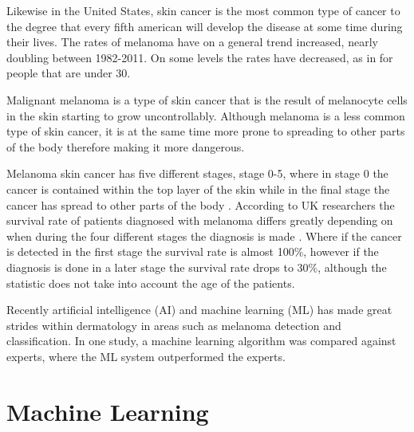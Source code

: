 \documentclass{kththesis}
\begin{document}
Likewise in the United States, skin cancer is the most common type of cancer to the degree that every fifth american will develop the disease at some time during their lives. The rates of melanoma have on a general trend increased, nearly doubling between 1982-2011. On some levels the rates have decreased, as in for people that are under 30. \parencite{aad-skin-cancer}

Malignant melanoma is a type of skin cancer that is the result of melano\-cyte cells in the skin starting to grow uncontrollably.
Although melanoma is a less common type of skin cancer, it is at the same time more prone to spreading to other parts of the body therefore making it more dangerous. \parencite{aad-skin-cancer}

Melanoma skin cancer has five different stages, stage 0-5, where in stage 0 the cancer is contained within the top layer of the skin while in the final stage the cancer has spread to other parts of the body \parencite{cancerresearchuk-melanoma}.
According to UK researchers the survival rate of patients diagnosed with melanoma differs greatly depending on when during the four different stages the diagnosis is made \parencite{cancerresearchuk-survival}.
Where if the cancer is detected in the first stage the survival rate is almost 100\%, however if the diagnosis is done in a later stage the survival rate drops to 30\%, although the statistic does not take into account the age of the patients. \parencite{cancerresearchuk-survival}

Recently artificial intelligence (AI) and machine learning (ML) has made great strides within dermatology in areas such as melanoma detection and classification. In one study, a machine learning algorithm was compared against experts, where the ML system outperformed the experts. \parencite{8030303}


\section{Machine Learning}

\end{document}
